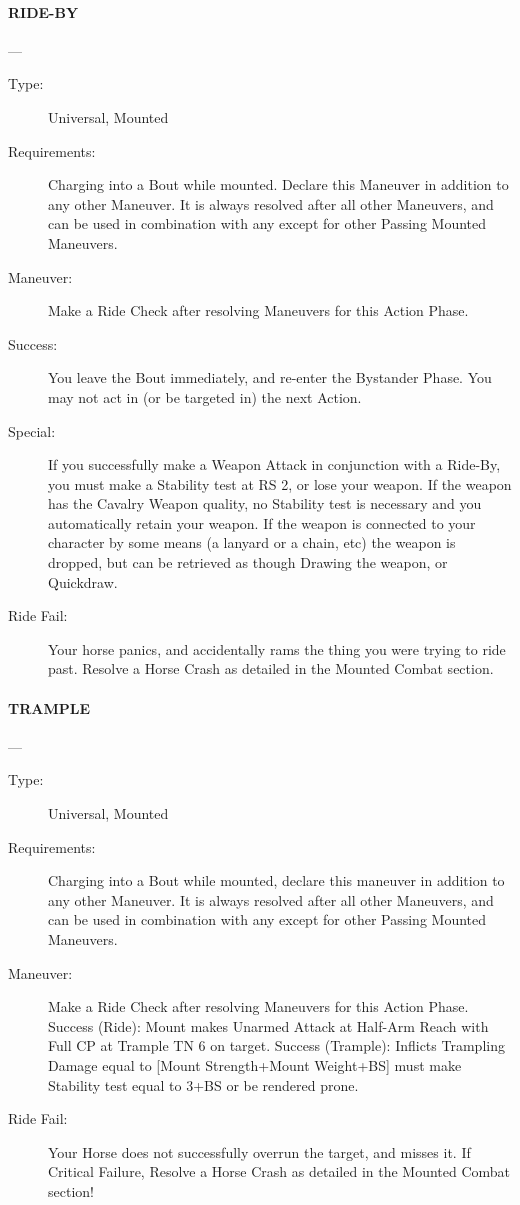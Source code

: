\documentclass[oneside,11pt,english]{book}
\begin{document}
\paragraph{\large\label{man:RIDE-BY} RIDE-BY}---
\vspace{-10pt}\begin{description} 
\item [Type:] Universal, Mounted 
\item [Requirements:] Charging into a Bout while mounted. Declare this Maneuver in addition to any other 
Maneuver. It is always resolved after all other Maneuvers, and can be used in combination with any 
except for other Passing Mounted Maneuvers. 
\item [Maneuver:] Make a Ride Check after resolving Maneuvers for this Action Phase. 
\item [Success:] You leave the Bout immediately, and re-enter the Bystander Phase. You may not act in (or be 
targeted in) the next Action. 
\item [Special:] If you successfully make a Weapon Attack in conjunction with a Ride-By, you must make a 
Stability test at RS 2, or lose your weapon. If the weapon has the Cavalry Weapon quality, no Stability 
test is necessary and you automatically retain your weapon. If the weapon is connected to your character 
by some means (a lanyard or a chain, etc) the weapon is dropped, but can be retrieved as though Drawing 
the weapon, or Quickdraw. 
\item [Ride Fail:] Your horse panics, and accidentally rams the thing you were trying to ride past. Resolve a 
Horse Crash as detailed in the Mounted Combat section.
\end{description}
\paragraph{\large\label{man:TRAMPLE} TRAMPLE}---
\vspace{-10pt}\begin{description} 
\item [Type:] Universal, Mounted 
\item [Requirements:] Charging into a Bout while mounted, declare this maneuver in addition to any other 
Maneuver. It is always resolved after all other Maneuvers, and can be used in combination with any 
except for other Passing Mounted Maneuvers. 
\item [Maneuver:] Make a Ride Check after resolving Maneuvers for this Action Phase. 
Success (Ride): Mount makes Unarmed Attack at Half-Arm Reach with Full CP at Trample TN 6 on 
target. 
Success (Trample): Inflicts Trampling Damage equal to [Mount Strength+Mount Weight+BS] must make 
Stability test equal to 3+BS or be rendered prone. 
\item [Ride Fail:] Your Horse does not successfully overrun the target, and misses it. If Critical Failure, Resolve 
a Horse Crash as detailed in the Mounted Combat section!
\end{description}
\end{document}

